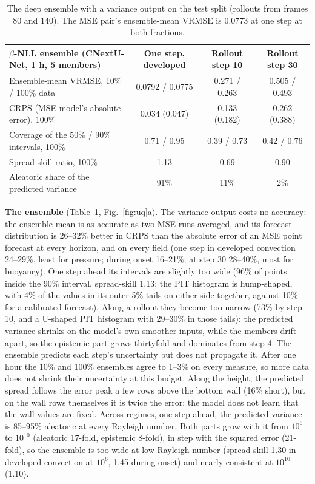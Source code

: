 \documentclass[11pt]{article}
\begin{document}
\begin{table}[tp]
\centering\small
\begin{tabular}{@{}lccc@{}}
\toprule
$\beta$-NLL ensemble (CNextU-Net, 1 h, 5 members) & One step, developed & Rollout step 10 & Rollout step 30 \\
\midrule
Ensemble-mean VRMSE, 10\% / 100\% data & 0.0792 / 0.0775 & 0.271 / 0.263 & 0.505 / 0.493 \\
CRPS (MSE model's absolute error), 100\% & 0.034 (0.047) & 0.133 (0.182) & 0.262 (0.388) \\
Coverage of the 50\% / 90\% intervals, 100\% & 0.71 / 0.95 & 0.39 / 0.73 & 0.42 / 0.76 \\
Spread-skill ratio, 100\% & 1.13 & 0.69 & 0.90 \\
Aleatoric share of the predicted variance & 91\% & 11\% & 2\% \\
\bottomrule
\end{tabular}
\caption{The deep ensemble with a variance output on the test split (rollouts from frames 80 and 140). The MSE pair's
ensemble-mean VRMSE is 0.0773 at one step at both fractions.}
\label{tab:uqa}
\end{table}

\textbf{The ensemble} (Table~\ref{tab:uqa}, Fig.~\ref{fig:uq}a). The variance output costs no accuracy: the
ensemble mean is as accurate as two MSE runs averaged, and its forecast distribution is 26--32\% better in CRPS than the
absolute error of an MSE point forecast at every horizon, and on every field (one step in developed convection 24--29\%,
least for pressure; during onset 16--21\%; at step 30 28--40\%, most for buoyancy). One step ahead its intervals are slightly too wide (96\% of
points inside the 90\% interval, spread-skill 1.13; the PIT histogram is hump-shaped, with 4\% of the values in its
outer 5\% tails on either side together, against 10\% for a calibrated forecast). Along a rollout they become too
narrow (73\% by step 10, and a U-shaped PIT histogram with 29--30\% in those tails): the
predicted variance shrinks on the model's own smoother inputs, while the members drift apart, so the epistemic part
grows thirtyfold and dominates from step 4. The ensemble predicts each step's uncertainty but does not propagate it.
After one hour the 10\% and 100\% ensembles agree to 1--3\% on every measure, so more data does not shrink their
uncertainty at this budget. Along the height, the predicted spread follows the error peak a few rows above the bottom
wall (16\% short), but on the wall rows themselves it is twice the error: the model does not learn that the wall values
are fixed. Across regimes, one step ahead, the predicted variance is 85--95\% aleatoric at every Rayleigh number. Both
parts grow with it from $10^6$ to $10^{10}$ (aleatoric 17-fold, epistemic 8-fold), in step with the squared error
(21-fold), so the ensemble is too wide at low Rayleigh number (spread-skill 1.30 in developed convection at $10^6$,
1.45 during onset) and nearly consistent at $10^{10}$ (1.10).
\end{document}
